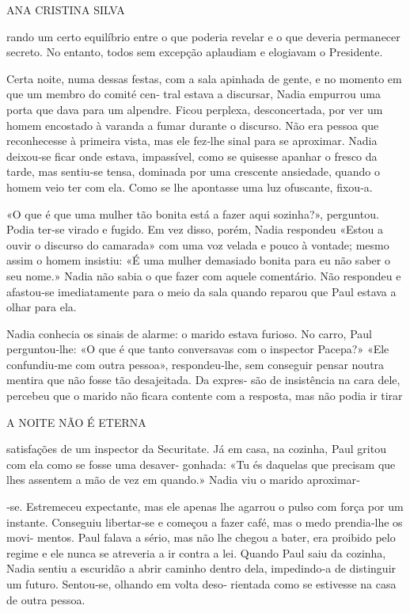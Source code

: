 ANA CRISTINA SILVA

rando um certo equilíbrio entre o que poderia revelar e o que deveria
permanecer secreto. No entanto, todos sem excepção aplaudiam e elogiavam
o Presidente.

Certa noite, numa dessas festas, com a sala apinhada de gente, e no
momento em que um membro do comité cen‑ tral estava a discursar, Nadia
empurrou uma porta que dava para um alpendre. Ficou perplexa,
desconcertada, por ver um homem encostado à varanda a fumar durante o
discurso. Não era pessoa que reconhecesse à primeira vista, mas ele
fez‑lhe sinal para se aproximar. Nadia deixou‑se ficar onde estava,
impassível, como se quisesse apanhar o fresco da tarde, mas sentiu‑se
tensa, dominada por uma crescente ansiedade, quando o homem veio ter com
ela. Como se lhe apontasse uma luz ofuscante, fixou‑a.

«O que é que uma mulher tão bonita está a fazer aqui sozinha?»,
perguntou. Podia ter‑se virado e fugido. Em vez disso, porém, Nadia
respondeu «Estou a ouvir o discurso do camarada» com uma voz velada e
pouco à vontade; mesmo assim o homem insistiu: «É uma mulher demasiado
bonita para eu não saber o seu nome.» Nadia não sabia o que fazer com
aquele comentário. Não respondeu e afastou‑se imediatamente para o meio
da sala quando reparou que Paul estava a olhar para ela.

Nadia conhecia os sinais de alarme: o marido estava furioso. No carro,
Paul perguntou‑lhe: «O que é que tanto conversavas com o inspector
Pacepa?» «Ele confundiu‑me com outra pessoa», respondeu‑lhe, sem
conseguir pensar noutra mentira que não fosse tão desajeitada. Da
expres‑ são de insistência na cara dele, percebeu que o marido não
ficara contente com a resposta, mas não podia ir tirar

A NOITE NÃO É ETERNA

satisfações de um inspector da Securitate. Já em casa, na cozinha, Paul
gritou com ela como se fosse uma desaver‑ gonhada: «Tu és daquelas que
precisam que lhes assentem a mão de vez em quando.» Nadia viu o marido
aproximar‑

‑se. Estremeceu expectante, mas ele apenas lhe agarrou o pulso com força
por um instante. Conseguiu libertar‑se e começou a fazer café, mas o
medo prendia‑lhe os movi‑ mentos. Paul falava a sério, mas não lhe
chegou a bater, era proibido pelo regime e ele nunca se atreveria a ir
contra a lei. Quando Paul saiu da cozinha, Nadia sentiu a escuridão a
abrir caminho dentro dela, impedindo‑a de distinguir um futuro.
Sentou‑se, olhando em volta deso‑ rientada como se estivesse na casa de
outra pessoa.

